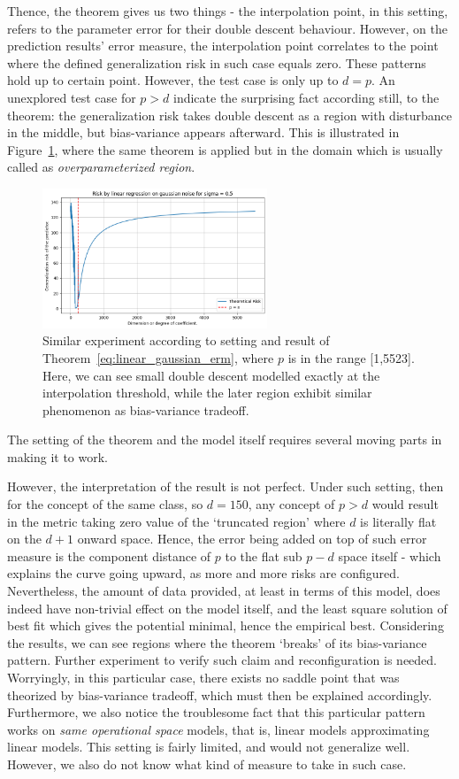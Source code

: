 \documentclass{article}
\begin{document}
Thence, the theorem gives us two things - the interpolation point, in this setting, refers to the parameter error for their double descent behaviour. However, on the prediction results' error measure, the interpolation point correlates to the point where the defined generalization risk in such case equals zero. These patterns hold up to certain point. However, the test case is only up to $d=p$. An unexplored test case for $p>d$ indicate the surprising fact according still, to the theorem: the generalization risk takes double descent as a region with disturbance in the middle, but bias-variance appears afterward. This is illustrated in Figure~\ref{fig:contrarian}, where the same theorem is applied but in the domain which is usually called as \textit{overparameterized region}. 
\begin{figure}[htp]
  \centering
  \includegraphics[width=0.6\textwidth]{img/dimensional_descent.png}
  \caption{Similar experiment according to setting and result of Theorem~\ref{eq:linear_gaussian_erm}, where $p$ is in the range [1,5523]. Here, we can see small double descent modelled exactly at the interpolation threshold, while the later region exhibit similar phenomenon as bias-variance tradeoff.}
  \label{fig:contrarian}
\end{figure}

The setting of the theorem and the model itself requires several moving parts in making it to work. 

However, the interpretation of the result is not perfect. Under such setting, then for the concept of the same class, so $d=150$, any concept of $p>d$ would result in the metric taking zero value of the `truncated region' where $d$ is literally flat on the $d+1$ onward space. Hence, the error being added on top of such error measure is the component distance of $p$ to the flat sub $p-d$ space itself - which explains the curve going upward, as more and more risks are configured. Nevertheless, the amount of data provided, at least in terms of this model, does indeed have non-trivial effect on the model itself, and the least square solution of best fit which gives the potential minimal, hence the empirical best. Considering the results, we can see regions where the theorem `breaks' of its bias-variance pattern. Further experiment to verify such claim and reconfiguration is needed. Worryingly, in this particular case, there exists no saddle point that was theorized by bias-variance tradeoff, which must then be explained accordingly. Furthermore, we also notice the troublesome fact that this particular pattern works on \textit{same operational space} models, that is, linear models approximating linear models. This setting is fairly limited, and would not generalize well. However, we also do not know what kind of measure to take in such case. 
\end{document}
